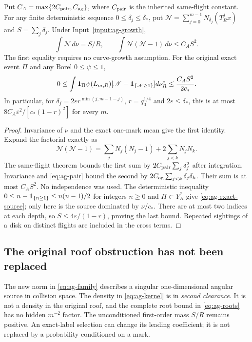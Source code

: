 \begin{corollary}
\label{cor:ag-record}
Put $C_A=\max\{2C_{\rm pair},C_{\rm ag}\}$, where $C_{\rm pair}$
is the inherited same-flight constant. For any finite deterministic
sequence $0\le\delta_j\le\delta_*$, put
$\mathscr N=\sum_{j=0}^{m-1}N_{\delta_j}(T_R^jx)$ and
$S=\sum_j\delta_j$. Under Input~\ref{input:ag-growth},
\begin{equation}\label{eq:ag-factorial}
 \int\mathscr N\,d\nu=S/R,\qquad
 \int\mathscr N(\mathscr N-1)\,d\nu\le C_A S^2.
\end{equation}
The first equality requires no curve-growth assumption. For the
original exact event $\Pi$ and any Borel $0\le\psi\le1$,
\begin{equation}\label{eq:ag-exact-source}
 0\le\int\mathbf1_\Pi\psi(L_{m,R})
          [\mathscr N-\mathbf1_{\{\mathscr N\ge1\}}]d\nu_R^*
              \le\frac{C_A S^2}{2c_*}.
\end{equation}
In particular, for $\delta_j=2\varepsilon r^{\min(j,m-1-j)}$,
$r=q_0^{1/4}$ and $2\varepsilon\le\delta_*$, this is at most
$8C_A\varepsilon^2/[c_*(1-r)^2]$ for every $m$.
\end{corollary}
\begin{proof}
Invariance of $\nu$ and the exact one-mark mean give the first
identity. Expand the factorial exactly as
\[
 \mathscr N(\mathscr N-1)=\sum_jN_j(N_j-1)
                         +2\sum_{j<k}N_jN_k.
\]
The same-flight theorem bounds the first sum by
$2C_{\rm pair}\sum_j\delta_j^2$ after integration. Invariance
and \eqref{eq:ag-pair} bound the second by
$2C_{\rm ag}\sum_{j<k}\delta_j\delta_k$. Their sum is at most
$C_A S^2$. No independence was used. The deterministic inequality
$0\le n-\mathbf1_{\{n\ge1\}}\le n(n-1)/2$ for integers $n\ge0$
and $\Pi\subset Y_R^*$ give \eqref{eq:ag-exact-source}; only here
is the source dominated by $\nu/c_*$. There are at most two
indices at each depth, so $S\le4\varepsilon/(1-r)$, proving the
last bound. Repeated sightings of a disk on distinct flights are
included in the cross terms.
\end{proof}

\subsection{The original roof obstruction has not been replaced}
The new norm in \eqref{eq:ag-family} describes a singular
one-dimensional angular source in collision space. The density
in \eqref{eq:ag-kernel} is in \emph{second clearance}. It is not
a density in the original roof, and the complete root bound in
\eqref{eq:ag-roots} has no hidden $m^{-2}$ factor. The unconditioned
first-order mass $S/R$ remains positive. An exact-label selection
can change its leading coefficient; it is not replaced by a
probability conditioned on a mark.

